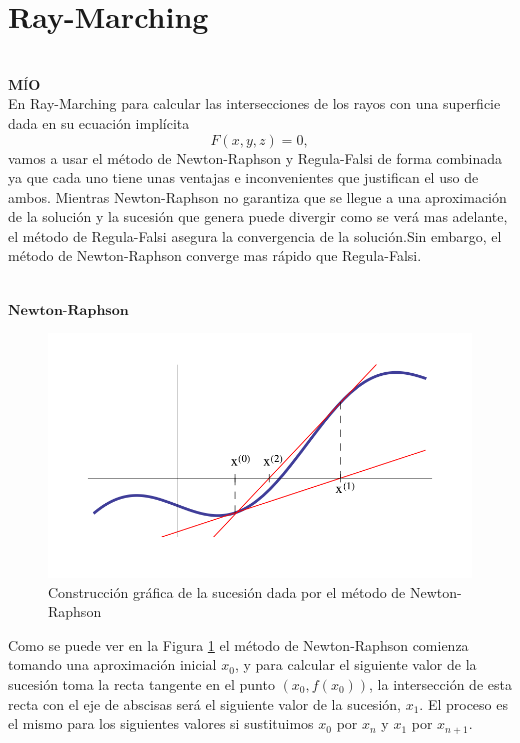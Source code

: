 \chapter*{Ray-Marching}

${ }$\\
$\textbf{MÍO}$
${ }$\\

En Ray-Marching para calcular las intersecciones de los rayos con una superficie dada en su ecuación implícita
\[
	F(x,y,z) = 0,
\]
vamos a usar el método de Newton-Raphson y Regula-Falsi de forma combinada ya que cada uno tiene unas ventajas e inconvenientes que justifican el uso de ambos. Mientras Newton-Raphson no garantiza que se llegue a una aproximación de la solución y la sucesión que genera puede divergir como se verá mas adelante, el método de Regula-Falsi asegura la convergencia de la solución.Sin embargo, el método de Newton-Raphson converge mas rápido que Regula-Falsi.


${ }$\\
$\textbf{Newton-Raphson}$
${ }$\\

\begin{figure}
	\begin{center}
		\includegraphics[width=1.0\textwidth]{imagenes/newton.png}
	\end{center}
	\caption{Construcción gráfica de la sucesión dada por el método de Newton-Raphson}
	\label{fig:etiq_7}
\end{figure}

Como se puede ver en la Figura \ref{fig:etiq_7} el método de Newton-Raphson comienza tomando una aproximación inicial $x_0$, y para calcular el siguiente valor de la sucesión toma la recta tangente en el punto $(x_0, f(x_0))$, la intersección de esta recta con el eje de abscisas será el siguiente valor de la sucesión, $x_1$. El proceso es el mismo para los siguientes valores si sustituimos $x_0$ por $x_n$ y $x_1$ por $x_{n+1}$.
${ }$\\


